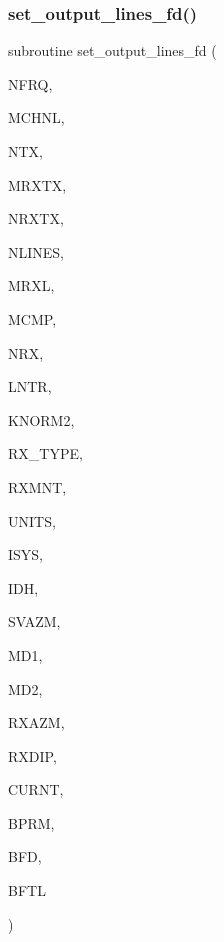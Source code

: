 \subsubsection{\texorpdfstring{set\+\_\+output\+\_\+lines\+\_\+fd()}{set\_output\_lines\_fd()}}
{\footnotesize\ttfamily subroutine set\+\_\+output\+\_\+lines\+\_\+fd (\begin{DoxyParamCaption}\item[{integer}]{N\+F\+RQ,  }\item[{integer}]{M\+C\+H\+NL,  }\item[{integer}]{N\+TX,  }\item[{integer}]{M\+R\+X\+TX,  }\item[{integer, dimension(ntx)}]{N\+R\+X\+TX,  }\item[{integer}]{N\+L\+I\+N\+ES,  }\item[{integer}]{M\+R\+XL,  }\item[{integer}]{M\+C\+MP,  }\item[{integer, dimension(nlines)}]{N\+RX,  }\item[{integer, dimension(4,nlines)}]{L\+N\+TR,  }\item[{integer, dimension(mrxtx,ntx)}]{K\+N\+O\+R\+M2,  }\item[{integer, dimension(nlines)}]{R\+X\+\_\+\+T\+Y\+PE,  }\item[{real, dimension(nlines)}]{R\+X\+M\+NT,  }\item[{integer, dimension(nlines)}]{U\+N\+I\+TS,  }\item[{integer}]{I\+S\+YS,  }\item[{integer, dimension(nlines)}]{I\+DH,  }\item[{real, dimension(nlines)}]{S\+V\+A\+ZM,  }\item[{integer}]{M\+D1,  }\item[{integer}]{M\+D2,  }\item[{real, dimension(md1,md2)}]{R\+X\+A\+ZM,  }\item[{real, dimension(md1,md2)}]{R\+X\+D\+IP,  }\item[{real, dimension(nfrq)}]{C\+U\+R\+NT,  }\item[{real, dimension(mrxtx,ntx)}]{B\+P\+RM,  }\item[{complex, dimension(nfrq,mrxtx,ntx,3)}]{B\+FD,  }\item[{real, dimension(mchnl,mrxl,mcmp,nlines)}]{B\+F\+TL }\end{DoxyParamCaption})}

